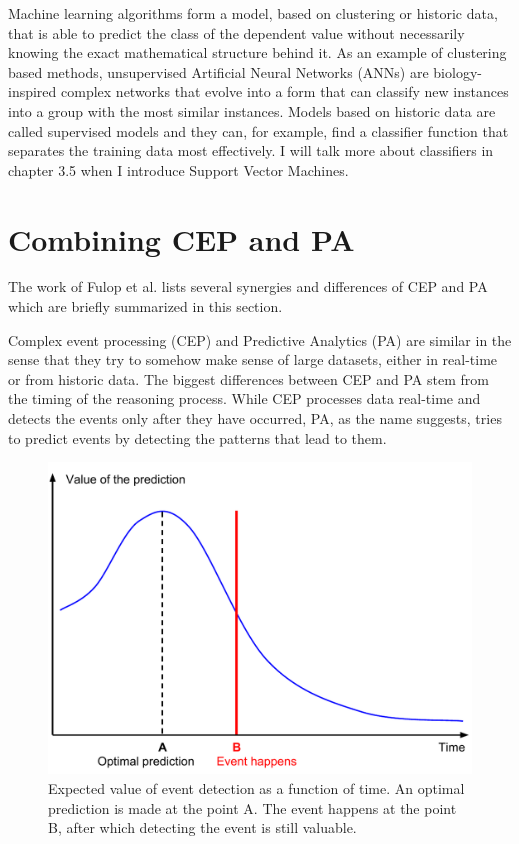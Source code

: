 Machine learning algorithms form a model, based on clustering or historic data, that is able to predict the class of the dependent value without necessarily knowing the exact mathematical structure behind it. As an example of clustering based methods, unsupervised Artificial Neural Networks (ANNs) are biology-inspired complex networks that evolve into a form that can classify new instances into a group with the most similar instances. \cite{Mitchell97} Models based on historic data are called supervised models and they can, for example, find a classifier function that separates the training data most effectively. I will talk more about classifiers in chapter 3.5 when I introduce Support Vector Machines.



\section{Combining CEP and PA}

The work of Fulop et al. \cite{Fulop12} lists several synergies and differences of CEP and PA which are briefly summarized in this section. 

Complex event processing (CEP) and Predictive Analytics (PA) are similar in the sense that they try to somehow make sense of large datasets, either in real-time or from historic data. The biggest differences between CEP and PA stem from the timing of the reasoning process. While CEP processes data real-time and detects the events only after they have occurred, PA, as the name suggests, tries to predict events by detecting the patterns that lead to them. 

\begin{figure}[here]
\centering
\includegraphics[scale=0.7]{images/prediction_value_v2.pdf}
\caption{Expected value of event detection as a function of time. An optimal prediction is made at the point A. The event happens at the point B, after which detecting the event is still valuable.}
\label{fig:prediction_value}
\end{figure}

